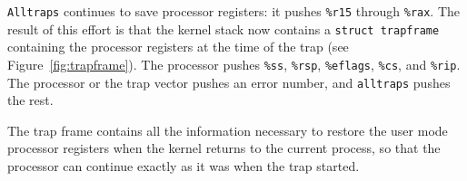 \lstinline{Alltraps}
continues to save processor registers: it pushes
\texttt{\%r15}
through
\texttt{\%rax}.
The result of this effort is that the kernel stack now contains a
\lstinline{struct trapframe}
containing the processor registers at the time of the trap (see 
Figure~\ref{fig:trapframe}).
The processor pushes
\texttt{\%ss},
\texttt{\%rsp},
\texttt{\%eflags},
\texttt{\%cs}, 
and
\texttt{\%rip}.
The processor or the trap vector pushes an error number,
and 
\lstinline{alltraps} 
pushes the rest.

The trap frame contains all the information necessary
to restore the user mode processor registers
when the kernel returns to the current process,
so that the processor can continue exactly as it was when
the trap started.

